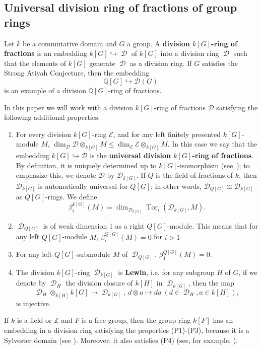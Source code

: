 \documentclass{amsart}
\theoremstyle{definition}
\theoremstyle{remark}
\DeclareMathOperator{\D}{\mathcal D}
\DeclareMathOperator{\Tor}{Tor}
\newcommand{\Z}{\mathbb{Z}}
\begin{document}
\subsection{Universal division ring of fractions of group rings}\label{sect:universal}
Let $k$ be a commutative domain and  $G$ a group. A {\bf division ${k[G]}$-ring of fractions} is an embedding $k[G]\hookrightarrow \D$ of ${k[G]}$  into a division ring $\D$ such that the elements of ${k[G]}$ generate $\D$ as a division ring. If $G$ satisfies the Strong Atiyah Conjecture, then the embedding 
\[
\mathbb{Q}[G] \hookrightarrow \mathcal{D}(G)
\]
is an example of a division $\mathbb{Q}[G]$-ring of fractions.


In this paper we will work with a division ${k[G]}$-ring of fractions $\mathcal{D}$ 
satisfying the following additional properties:

\begin{enumerate}
\item[(P1)] For every division ${k[G]}$-ring $\mathcal E$, and for  any  left finitely presented ${k[G]}$-module $M$,
$\dim_{\mathcal D}  \mathcal D\otimes _{k[G]} M\le \dim_{\mathcal E} \mathcal E \otimes _{k[G]} M.$
In this case we say that the embedding ${k[G]}\hookrightarrow \mathcal{D}$ 
is the {\bf universal division ${k[G]}$-ring of fractions}.  
By definition, it is uniquely determined up to ${k[G]}$-isomorphism 
(see~\cite{Ma80}); to emphasize this, we denote $\mathcal{D}$ by $\mathcal{D}_{k[G]}$.  
If $Q$ is the field of fractions of $k$, then $\mathcal{D}_{k[G]}$ is automatically universal for $Q[G]$; 
in other words, 
\(
\mathcal{D}_{Q[G]} \cong \mathcal{D}_{k[G]}
\)
as $Q[G]$-rings. We define
$$\beta_i^{k[G]}(M)=\dim_{\mathcal D_{k[G]}} \Tor_i(\mathcal D_{k[G]}, M).$$

\item[(P2)] $\D_{Q[G]}$ is of weak dimension 1 as a right ${Q[G]}$-module. This means  that for any  left ${Q[G]}$-module $M$,
$\beta_i^{Q[G]}(M)=0$ for $i>1$.
\item[(P3)] For any left ${Q[G]}$-submodule $M$ of $\D_{Q[G]}$,  $\beta_1^{Q[G]}(M)=0$.
\item[(P4)]  The division ${k[G]}$-ring $\D_{{k[G]}}$ is {\bf Lewin}, i.e.
for any subgroup $H$ of $G$, if we denote by $\D_H$  the division closure of $k[H]$ in $\D_{k[G]}$, then  the map $$\D_H\otimes_{k[H]} k[G]\to \D_{k[G]},\ d\otimes   a\mapsto da \ (d\in \D_H, a\in k[H]),$$ is injective.
\end{enumerate}
If $k$ is a field or $\Z$ and $F$ is a free group,  then the group ring $k[F]$ has an embedding in a division ring  satisfying  the properties (P1)-(P3), because it is a Sylvester domain (see \cite{DS78}). Moreover, it also satisfies (P4) (see, for example, \cite[Subsection 2.3]{Ja21}). %
\end{document}
